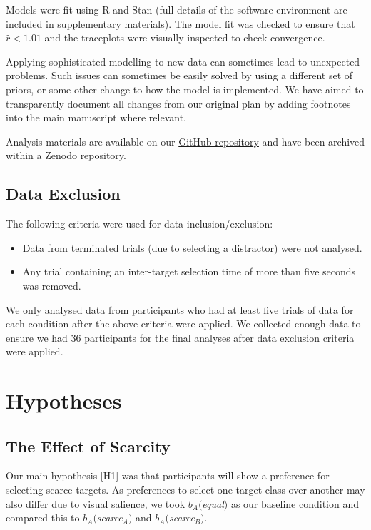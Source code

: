 \documentclass[12pt]{article}
\begin{document}
Models were fit using R \citep{Rcoreteam} and Stan \citep{rstan} (full details of the software environment are included in supplementary materials). The model fit was checked to ensure that $\hat{r} <1.01$ and the traceplots were visually inspected to check convergence.  

Applying sophisticated modelling to new data can sometimes lead to unexpected problems. Such issues can sometimes be easily solved by using a different set of priors, or some other change to how the model is implemented. We have aimed to transparently document all changes from our original plan by adding footnotes into the main manuscript where relevant.

Analysis materials are available on our  \href{https://github.com/Riadsala/foraging_scarcity}{GitHub repository} and have been archived within a \href{https://doi.org/10.5281/zenodo.13951971} {Zenodo repository}.

\subsection{Data Exclusion}

The following criteria were used for data inclusion/exclusion:

\begin{itemize}
    \item Data from terminated trials (due to selecting a distractor) were not  analysed.
    \item Any trial containing an inter-target selection time of more than five seconds was removed.
\end{itemize}

We only analysed data from participants who had at least five trials of data for each condition after the above criteria were applied. We collected enough data to ensure we had 36 participants for the final analyses after data exclusion criteria were applied.

\section{Hypotheses}

\subsection{The Effect of Scarcity}
Our main hypothesis [H1] was that participants will show a preference for selecting scarce targets. As preferences to select one target class over another may also differ due to visual salience, we took $b_A($\textit{equal}$)$ as our baseline condition and compared this to $b_A($\textit{scarce$_A$}$)$ and $b_A($\textit{scarce$_B$}$)$.
\end{document}
